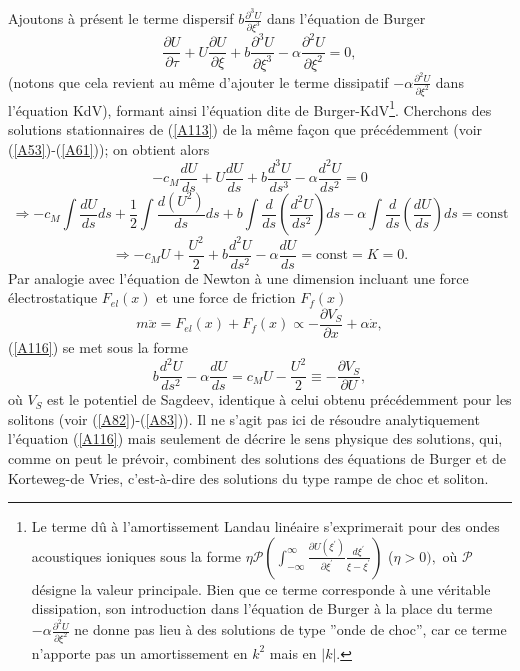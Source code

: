 \documentclass[10pt,thmsa]{article}
\begin{document}
Ajoutons \`{a} pr\'{e}sent le terme dispersif $b\frac{\partial^{3}U}%
{\partial\xi^{3}}$ dans l'\'{e}quation de Burger
\begin{equation}
\frac{\partial U}{\partial\tau}+U\frac{\partial U}{\partial\xi}+b\frac
{\partial^{3}U}{\partial\xi^{3}}-\alpha\frac{\partial^{2}U}{\partial\xi^{2}%
}=0,\label{A113}%
\end{equation}
(notons que cela revient au m\^{e}me d'ajouter le terme dissipatif
$-\alpha\frac{\partial^{2}U}{\partial\xi^{2}}$ dans l'\'{e}quation KdV),
formant ainsi l'\'{e}quation dite de Burger-KdV\footnote{Le terme d\^{u} \`{a}
l'amortissement Landau lin\'{e}aire s'exprimerait pour des ondes acoustiques
ioniques sous la forme $\eta\mathcal{P}\left(  \int_{-\infty}^{\infty}%
\frac{\partial U(\xi^{\prime})}{\partial\xi^{\prime}}\frac{d\xi^{\prime}}%
{\xi-\xi^{\prime}}\right)  $ ($\eta>0),$ o\`{u} $\mathcal{P}$ d\'{e}signe la
valeur principale. Bien que ce terme corresponde \`{a} une v\'{e}ritable
dissipation, son introduction dans l'\'{e}quation de Burger \`{a} la place du
terme $-\alpha\frac{\partial^{2}U}{\partial\xi^{2}}$ ne donne pas lieu \`{a}
des solutions de type \textquotedblright onde de choc\textquotedblright, car
ce terme n'apporte pas un amortissement en $k^{2}$ mais en $\left\vert
k\right\vert .$}. Cherchons des solutions stationnaires de (\ref{A113}) de la
m\^{e}me fa\c{c}on que pr\'{e}c\'{e}demment (voir (\ref{A53})-(\ref{A61})); on
obtient alors
\begin{equation}
-c_{M}\frac{dU}{ds}+U\frac{dU}{ds}+b\frac{d^{3}U}{ds^{3}}-\alpha\frac{d^{2}%
U}{ds^{2}}=0\label{A114}%
\end{equation}%
\begin{equation}
\Rightarrow-c_{M}\int\frac{dU}{ds}ds+\frac{1}{2}\int\frac{d(U^{2})}%
{ds}ds+b\int\frac{d}{ds}\left(  \frac{d^{2}U}{ds^{2}}\right)  ds-\alpha
\int\frac{d}{ds}\left(  \frac{dU}{ds}\right)  ds=\mathrm{const}\label{A115}%
\end{equation}%
\begin{equation}
\Rightarrow-c_{M}U+\frac{U^{2}}{2}+b\frac{d^{2}U}{ds^{2}}-\alpha\frac{dU}%
{ds}=\mathrm{const}=K=0.\label{A116}%
\end{equation}
Par analogie avec l'\'{e}quation de Newton \`{a} une dimension incluant une
force \'{e}lectrostatique $F_{el}(x)$ et une force de friction $F_{f}(x)$
\begin{equation}
m\ddot{x}=F_{el}(x)+F_{f}(x)\propto-\frac{\partial V_{S}}{\partial x}%
+\alpha\dot{x},\label{A117}%
\end{equation}
(\ref{A116}) se met sous la forme
\begin{equation}
b\frac{d^{2}U}{ds^{2}}-\alpha\frac{dU}{ds}=c_{M}U-\frac{U^{2}}{2}\equiv
-\frac{\partial V_{S}}{\partial U},\label{A118}%
\end{equation}
o\`{u} $V_{S}$ est le potentiel de Sagdeev, identique \`{a} celui obtenu
pr\'{e}c\'{e}demment pour les solitons (voir (\ref{A82})-(\ref{A83})). Il ne
s'agit pas ici de r\'{e}soudre analytiquement l'\'{e}quation (\ref{A116}) mais
seulement de d\'{e}crire le sens physique des solutions, qui, comme on peut le
pr\'{e}voir, combinent des solutions des \'{e}quations de Burger et de
Korteweg-de Vries, c'est-\`{a}-dire des solutions du type rampe de choc et soliton.
\end{document}
